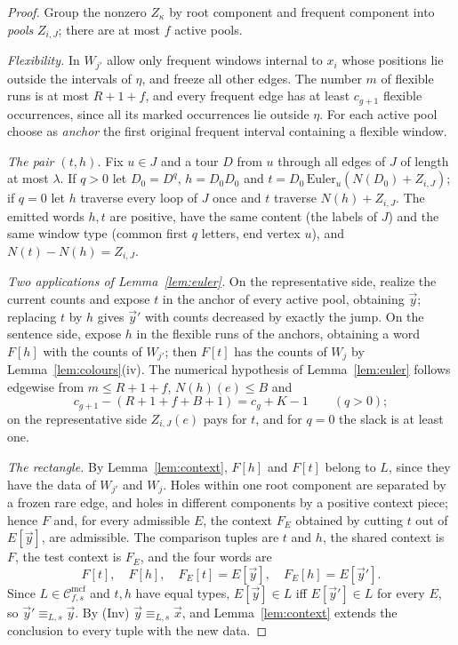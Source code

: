\documentclass[11pt]{article}
\numberwithin{equation}{section}
\theoremstyle{plain}
\theoremstyle{definition}
\theoremstyle{remark}
\theoremstyle{plain}
\newcommand{\Cmcf}[2]{\mathcal{C}^{\mathrm{mcf}}_{#1,#2}}
\newcommand{\tuple}[1]{\vec{#1}}
\begin{document}
\begin{proof}
Group the nonzero $Z_\kappa$ by root component and frequent component into
\emph{pools} $Z_{i,J}$; there are at most $f$ active pools.

\emph{Flexibility.}  In $W_{j'}$ allow only frequent windows internal to $x_i$
whose positions lie outside the intervals of $\eta$, and freeze all other edges.
The number $m$ of flexible runs is at most $R+1+f$, and every frequent edge has
at least $c_{g+1}$ flexible occurrences, since all its marked occurrences lie
outside $\eta$.  For each active pool choose as \emph{anchor} the first original
frequent interval containing a flexible window.

\emph{The pair $(t,h)$.}  Fix $u\in J$ and a tour $D$ from $u$ through all edges
of $J$ of length at most $\lambda$.  If $q>0$ let $D_0=D^q$, $h=D_0D_0$ and
$t=D_0\,\mathrm{Euler}_u(N(D_0)+Z_{i,J})$; if $q=0$ let $h$ traverse every loop
of $J$ once and $t$ traverse $N(h)+Z_{i,J}$.  The emitted words $h,t$ are
positive, have the same content (the labels of $J$) and the same window type
(common first $q$ letters, end vertex $u$), and $N(t)-N(h)=Z_{i,J}$.

\emph{Two applications of Lemma~\ref{lem:euler}.}  On the representative side,
realize the current counts and expose $t$ in the anchor of every active pool,
obtaining $\tuple y$; replacing $t$ by $h$ gives $\tuple y'$ with counts
decreased by exactly the jump.  On the sentence side, expose $h$ in the flexible
runs of the anchors, obtaining a word $F[h]$ with the counts of $W_{j'}$; then
$F[t]$ has the counts of $W_j$ by Lemma~\ref{lem:colours}(iv).  The numerical
hypothesis of Lemma~\ref{lem:euler} follows edgewise from $m\le R+1+f$,
$N(h)(e)\le B$ and
\[
 c_{g+1}-(R+1+f+B+1)=c_g+K-1\qquad(q>0);
\]
on the representative side $Z_{i,J}(e)$ pays for $t$, and for $q=0$ the slack is
at least one.

\emph{The rectangle.}  By Lemma~\ref{lem:context}, $F[h]$ and $F[t]$ belong to
$L$, since they have the data of $W_{j'}$ and $W_j$.  Holes within one root
component are separated by a frozen rare edge, and holes in different components
by a positive context piece; hence $F$ and, for every admissible $E$, the
context $F_E$ obtained by cutting $t$ out of $E[\tuple y]$, are admissible.  The
comparison tuples are $t$ and $h$, the shared context is $F$, the test context
is $F_E$, and the four words are
\[
F[t],\quad F[h],\quad F_E[t]=E[\tuple y],\quad F_E[h]=E[\tuple y'].
\]
Since $L\in\Cmcf{f}{s}$ and $t,h$ have equal types, $E[\tuple y]\in L$ iff
$E[\tuple y']\in L$ for every $E$, so $\tuple y'\equiv_{L,s}\tuple y$.  By (Inv)
$\tuple y\equiv_{L,s}\tuple x$, and Lemma~\ref{lem:context} extends the
conclusion to every tuple with the new data.
\end{proof}
\end{document}
